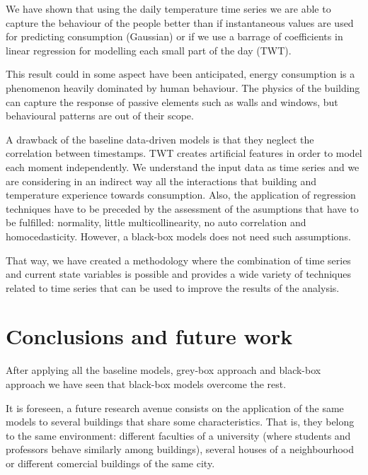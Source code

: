 \documentclass[10pt, conference, compsocconf]{IEEEtran}
\begin{document}

We have shown that using the daily temperature time series we are able to capture the behaviour of the people better than if instantaneous values are used for predicting consumption (Gaussian) or if we use a barrage of coefficients in linear regression for modelling each small part of the day (TWT). 

This result could in some aspect have been anticipated, energy consumption is a phenomenon heavily dominated by human behaviour. The physics of the building can capture the response of passive elements such as walls and windows, but behavioural patterns are out of their scope.

A drawback of the baseline data-driven models is that they neglect the correlation between timestamps. TWT creates artificial features in order to model each moment independently. We understand the input data as time series and we are considering in an indirect way all the interactions that building and temperature experience towards consumption.
Also, the application of regression techniques have to be preceded by the assessment of the asumptions that have to be fulfilled: normality, little multicollinearity, no auto correlation and homocedasticity. However, a black-box models does not need such assumptions.


That way, we have created a methodology where the combination of time series and current state variables is possible and provides a wide variety of techniques related to time series that can be used to improve the results of the analysis.

\section{Conclusions and future work}

After applying all the baseline models, grey-box approach and black-box approach we have seen that black-box models overcome the rest.



It is foreseen, a future research avenue consists on the application of the same models to several buildings that share some characteristics. That is, they belong to the same environment: different faculties of a university (where students and professors behave similarly among buildings), several houses of a neighbourhood or different comercial buildings of the same city.
\end{document}
